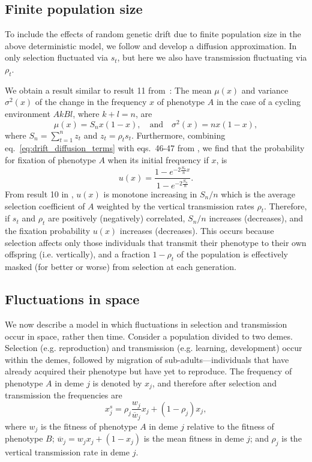 \documentclass[14pt]{extarticle}
\begin{document}
\subsection*{Finite population size}

To include the effects of random genetic drift due to finite population size in the above deterministic model, we follow \citet{Ram2018} and develop a diffusion  approximation.
In~\citet{Ram2018} only selection fluctuated via $s_t$, but here we also have transmission fluctuating via $\rho_t$. 

We obtain a result similar to result 11 from~\citet{Ram2018}:
The mean $\mu(x)$ and variance $\sigma^2(x)$ of the change in the frequency $x$ of phenotype $A$ in the case of a cycling environment $AkBl$, where $k+l=n$, are
\begin{equation} \label{eq:drift_diffusion_terms}
\mu(x) = S_n x(1-x),
\quad \text{and} \quad
\sigma^2(x) = n x (1-x),
\end{equation}
where $S_n = \sum_{t=1}^{n}{z_t}$ and $z_t = \rho_t s_t$.
Furthermore, combining eq.~\ref{eq:drift_diffusion_terms} with eqs.~46-47 from \citet{Ram2018}, we find that the probability for fixation of phenotype $A$ when its initial frequency if $x$, is
\begin{equation}
u(x) = \frac{1 - e^{-2 \frac{S_n}{n} x}}{1 - e^{-2 \frac{S_n}{n}}}.
\end{equation}
From result 10 in \citet{Ram2018}, $u(x)$ is monotone increasing in $S_n/n$ which is the average selection coefficient of $A$ weighted by the vertical transmission rates $\rho_t$.
Therefore, if $s_t$ and $\rho_t$ are positively (negatively) correlated, $S_n/n$ increases (decreases), and the fixation probability $u(x)$ increases (decreases). 
This occurs because selection  affects only those individuals that transmit their phenotype to their own offspring (i.e. vertically), and a fraction $1-\rho_t$ of the population is effectively masked (for better or worse) from selection at each generation.

\subsection*{Fluctuations in space}

We now describe a model in which fluctuations in selection and transmission occur in space, rather then time.
Consider a population divided to two demes.
Selection (e.g. reproduction) and transmission (e.g. learning, development) occur within the demes, followed by migration of sub-adults---individuals that have already acquired their phenotype but have yet to reproduce.
The frequency of phenotype $A$ in deme $j$ is denoted by $x_j$, and therefore after selection and transmission the frequencies are 
\begin{equation} \label{eq:migration_model_selection_transmission}
x_j^s = \rho_j \frac{w_j}{\overline{w}_j} x_j + (1-\rho_j) x_j,
\end{equation}
where $w_j$ is the fitness of phenotype $A$ in deme $j$ relative to the fitness of phenotype $B$; $\overline{w}_j=w_j x_j + (1-x_j)$ is the mean fitness in deme $j$; and $\rho_j$ is the vertical transmission rate in deme $j$.
\end{document}
